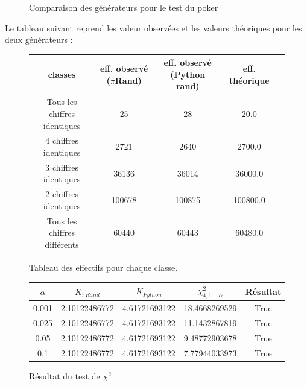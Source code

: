\documentclass[10pt,a4paper]{article}
\begin{document}
\begin{figure}[H]
\caption{Comparaison des générateurs pour le test du poker}
\label{poker_generator_histogram}
\end{figure}
Le tableau suivant reprend les valeur observées et les valeurs théoriques pour les deux générateurs :
\begin{figure}[H]
\begin{center}
\begin{longtable}{|c|c|c|c|c|}
\hline
classes & eff. observé ($\pi$Rand) & eff. observé (Python rand) & eff. théorique\\
\hline


Tous les chiffres identiques  & 25 & 28 & 20.0\\
4 chiffres identiques & 2721 & 2640 & 2700.0\\
3 chiffres identiques & 36136 & 36014 & 36000.0\\
2 chiffres identiques & 100678 & 100875 & 100800.0\\
Tous les chiffres différents  & 60440 & 60443 & 60480.0\\
\hline
\end{longtable}
\end{center}
\caption{Tableau des effectifs pour chaque classe.}
\end{figure}
\begin{figure}[H]
\begin{center}
\begin{tabular}{|c|c|c|c|c|}
\hline
$\alpha$ & $K_{\pi Rand}$ & $K_{Python}$ & $\chi^2_{4, 1 - \alpha}$ & Résultat\\
\hline
0.001 & 2.10122486772 & 4.61721693122 & 18.4668269529 & True\\
0.025 & 2.10122486772 & 4.61721693122 & 11.1432867819 & True\\
0.05 & 2.10122486772 & 4.61721693122 & 9.48772903678 & True\\
0.1 & 2.10122486772 & 4.61721693122 & 7.77944033973 & True\\
\hline
\end{tabular}
\end{center}
\caption{Résultat du test de $\chi^2$}
\end{figure}
\end{document}
